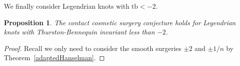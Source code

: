 \documentclass[12pt]{amsart}
\newtheorem{proposition}[theorem]{Proposition}
\theoremstyle{definition}
\theoremstyle{definition}
\newcommand{\tb}{\text{tb}}
\begin{document}
		We finally consider Legendrian knots with $\tb<-2$. 
		\begin{proposition}\label{p3}
			The contact cosmetic surgery conjecture holds for Legendrian knots with Thurston-Bennequin invariant less than $-2$. 
		\end{proposition}
		\begin{proof}
      
			Recall we only need to consider the smooth surgeries $\pm 2$ and $\pm 1/n$ by Theorem~\ref{adaptedHanselman}.
           
            
			
			
            
                
            
          

\end{proof}
\end{document}
